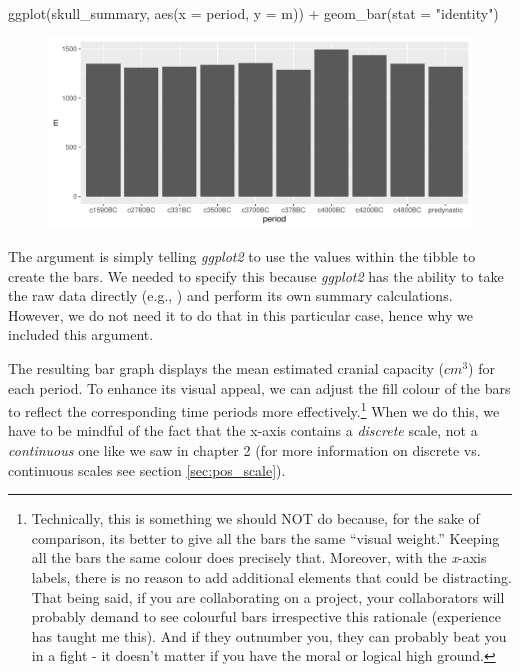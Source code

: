 \begin{inR}
ggplot(skull_summary, aes(x = period, y = m)) +
  geom_bar(stat = "identity")
\end{inR}

\vspace{2em}

\begin{figure}[H]
\includegraphics[scale = .75]{graphics/ch3Figs/bar_1.pdf}
\end{figure}

The argument  is simply telling \textit{ggplot2} to use the values within the  tibble to create the bars.  We needed to specify this because \textit{ggplot2} has the ability to take the raw data directly (e.g., ) and perform its own summary calculations. However, we do not need it to do that in this particular case, hence why we included this argument.

The resulting bar graph displays the mean estimated cranial capacity ($cm^3$) for each period. To enhance its visual appeal, we can adjust the fill colour of the bars to reflect the corresponding time periods more effectively.\footnote{Technically, this is something we should NOT do because, for the sake of comparison, its better to give all the bars the same ``visual weight.'' Keeping all the bars the same colour does precisely that. Moreover, with the \textit{x}-axis labels, there is no reason to add additional elements that could be distracting. That being said, if you are collaborating on a project, your collaborators will probably demand to see colourful bars irrespective this rationale (experience has taught me this). And if they outnumber you, they can probably beat you in a fight - it doesn't matter if you have the moral or logical high ground.} When we do this, we have to be mindful of the fact that the x-axis contains a \textit{discrete} scale, not a \textit{continuous} one like we saw in chapter 2 (for more information on discrete vs. continuous scales see section \ref{sec:pos_scale}).

